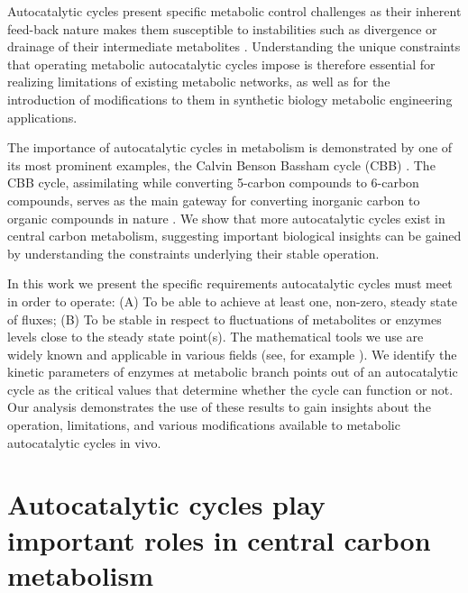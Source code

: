 \documentclass[a4page,notitlepage]{article}
\begin{document}
    Autocatalytic cycles present specific metabolic control challenges as their inherent feed-back nature makes them susceptible to instabilities such as divergence or drainage of their intermediate metabolites \cite{Fell1999,Reznik2010-te}.
    Understanding the unique constraints that operating metabolic autocatalytic cycles impose is therefore essential for realizing limitations of existing metabolic networks, as well as for the introduction of modifications to them in synthetic biology metabolic engineering applications.

    The importance of autocatalytic cycles in metabolism is demonstrated by one of its most prominent examples, the Calvin Benson Bassham cycle (CBB) \cite{Benson1950-cl}.
    The CBB cycle, assimilating  while converting 5-carbon compounds to 6-carbon compounds, serves as the main gateway for converting inorganic carbon to organic compounds in nature \cite{Raven2012-le}.
    We show that more autocatalytic cycles exist in central carbon metabolism, suggesting important biological insights can be gained by understanding the constraints underlying their stable operation.

    In this work we present the specific requirements autocatalytic cycles must meet in order to operate: (A) To be able to achieve at least one, non-zero, steady state of fluxes; 
    (B) To be stable in respect to fluctuations of metabolites or enzymes levels close to the steady state point(s).
    The mathematical tools we use are widely known and applicable in various fields (see, for example \cite{Strogatz2014-hp}).
    We identify the kinetic parameters of enzymes at metabolic branch points out of an autocatalytic cycle as the critical values that determine whether the cycle can function or not.
    Our analysis demonstrates the use of these results to gain insights about the operation, limitations, and various modifications available to metabolic autocatalytic cycles in vivo.

\section{Autocatalytic cycles play important roles in central carbon metabolism}
\end{document}

